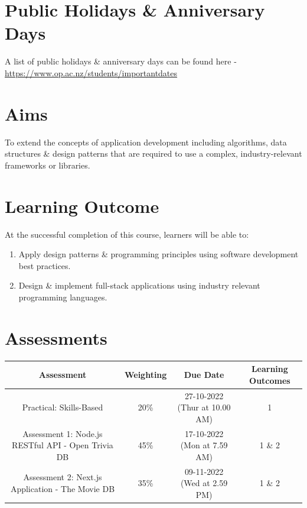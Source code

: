 \documentclass{article}
\begin{document}
\section*{Public Holidays \& Anniversary Days}
A list of public holidays \& anniversary days can be found here - \href{https://www.op.ac.nz/students/importantdates}{https://www.op.ac.nz/students/importantdates}

\section*{Aims}
To extend the concepts of application development including algorithms, data structures \& design patterns that are required to use a complex, industry-relevant frameworks or libraries.

\section*{Learning Outcome}
At the successful completion of this course, learners will be able to:
\begin{enumerate}
	\item Apply design patterns \& programming principles using software development best practices.
	\item Design \& implement full-stack applications using industry relevant programming languages.
\end{enumerate}

\section*{Assessments}
\renewcommand{\arraystretch}{1.5}
\begin{tabular}{|c|c|c|c|}
	\hline
	\textbf{Assessment}                                 & \textbf{Weighting} & \textbf{Due Date}            & \textbf{Learning Outcomes} \\ \hline
	\small Practical: Skills-Based & \small 20\%        & \small 27-10-2022 (Thur at 10.00 AM)   & \small 1                   \\ \hline
	\small Assessment 1: Node.js RESTful API - Open Trivia DB              & \small 45\%        & \small 17-10-2022 (Mon at 7.59 AM)  & \small 1 \& 2                   \\ \hline
	\small Assessment 2: Next.js Application - The Movie DB                       & \small 35\%        & \small 09-11-2022 (Wed at 2.59 PM)  & \small 1 \& 2                   \\ \hline
\end{tabular}
\end{document}
